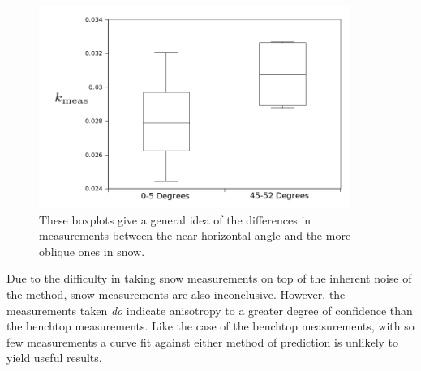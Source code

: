 \begin{figure}[h]
\centering
\includegraphics[width=0.9\textwidth]{fig/snow_meas_boxplot.png}
\caption{These boxplots give a general idea of the differences in measurements
between the near-horizontal angle and the more oblique ones in snow.}
\label{fig:test_boxplot}
\end{figure}


Due to the difficulty in taking snow measurements on top of the inherent noise
of the method, snow measurements are also inconclusive. However, the
measurements taken \emph{do} indicate anisotropy to a greater degree of confidence
than the benchtop measurements. Like the case of the benchtop measurements, with so few
measurements a curve fit against either method of prediction is unlikely to
yield useful results.
